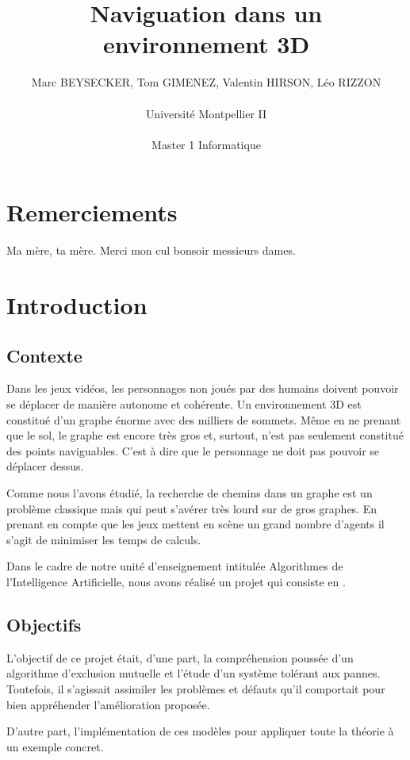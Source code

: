 \documentclass[a4paper,12pt]{report}
\title{Naviguation dans un environnement 3D \vspace{0.5cm}}
\author{Marc BEYSECKER, Tom GIMENEZ, Valentin HIRSON, Léo RIZZON\\  \\Université Montpellier II \\  \\Master 1 Informatique}
\date{}
\begin{document}
\maketitle

\tableofcontents

\newpage

\chapter{Remerciements}

Ma mère, ta mère. Merci mon cul bonsoir messieurs dames.

\chapter{Introduction}


\section*{Contexte}

Dans les jeux vidéos, les personnages non joués par des humains doivent pouvoir se déplacer de manière autonome et cohérente. Un environnement 3D est constitué d'un graphe énorme avec des milliers de sommets. Même en ne prenant que le sol, le graphe est encore très gros et, surtout, n'est pas seulement constitué des points naviguables. C'est à dire que le personnage ne doit pas pouvoir se déplacer dessus.

Comme nous l'avons étudié, la recherche de chemins dans un graphe est un problème classique mais qui peut s'avérer très lourd sur de gros graphes. En prenant en compte que les jeux mettent en scène un grand nombre d'agents il s'agit de minimiser les temps de calculs. 


Dans le cadre de notre unité d'enseignement intitulée Algorithmes de l'Intelligence Artificielle, nous avons réalisé un projet qui consiste en .


\section*{Objectifs}

L'objectif de ce projet était, d'une part, la compréhension poussée d'un algorithme d'exclusion mutuelle et l'étude d'un système tolérant aux pannes.  Toutefois, il s'agissait assimiler les problèmes et défauts qu'il comportait pour bien appréhender l'amélioration proposée.

D'autre part, l'implémentation de ces modèles pour appliquer toute la théorie à un exemple concret.
\end{document}
